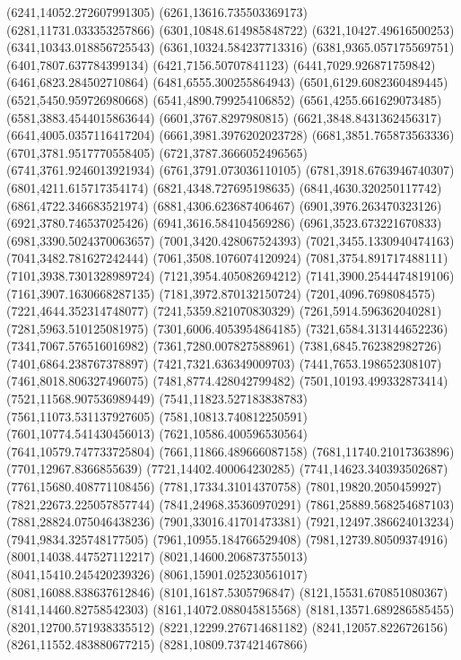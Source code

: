 {(6241,14052.272607991305)
(6261,13616.735503369173)
(6281,11731.033353257866)
(6301,10848.614985848722)
(6321,10427.49616500253)
(6341,10343.018856725543)
(6361,10324.584237713316)
(6381,9365.057175569751)
(6401,7807.637784399134)
(6421,7156.50707841123)
(6441,7029.926871759842)
(6461,6823.284502710864)
(6481,6555.300255864943)
(6501,6129.6082360489445)
(6521,5450.959726980668)
(6541,4890.799254106852)
(6561,4255.661629073485)
(6581,3883.4544015863644)
(6601,3767.8297980815)
(6621,3848.8431362456317)
(6641,4005.0357116417204)
(6661,3981.3976202023728)
(6681,3851.765873563336)
(6701,3781.9517770558405)
(6721,3787.3666052496565)
(6741,3761.9246013921934)
(6761,3791.073036110105)
(6781,3918.6763946740307)
(6801,4211.615717354174)
(6821,4348.727695198635)
(6841,4630.320250117742)
(6861,4722.346683521974)
(6881,4306.623687406467)
(6901,3976.263470323126)
(6921,3780.746537025426)
(6941,3616.584104569286)
(6961,3523.673221670833)
(6981,3390.5024370063657)
(7001,3420.428067524393)
(7021,3455.1330940474163)
(7041,3482.781627242444)
(7061,3508.1076074120924)
(7081,3754.891717488111)
(7101,3938.7301328989724)
(7121,3954.405082694212)
(7141,3900.2544474819106)
(7161,3907.1630668287135)
(7181,3972.870132150724)
(7201,4096.7698084575)
(7221,4644.352314748077)
(7241,5359.821070830329)
(7261,5914.596362040281)
(7281,5963.510125081975)
(7301,6006.4053954864185)
(7321,6584.313144652236)
(7341,7067.576516016982)
(7361,7280.007827588961)
(7381,6845.762382982726)
(7401,6864.238767378897)
(7421,7321.636349009703)
(7441,7653.198652308107)
(7461,8018.806327496075)
(7481,8774.428042799482)
(7501,10193.499332873414)
(7521,11568.907536989449)
(7541,11823.527183838783)
(7561,11073.531137927605)
(7581,10813.740812250591)
(7601,10774.541430456013)
(7621,10586.400596530564)
(7641,10579.747733725804)
(7661,11866.489666087158)
(7681,11740.21017363896)
(7701,12967.8366855639)
(7721,14402.400064230285)
(7741,14623.340393502687)
(7761,15680.408771108456)
(7781,17334.31014370758)
(7801,19820.2050459927)
(7821,22673.225057857744)
(7841,24968.35360970291)
(7861,25889.568254687103)
(7881,28824.075046438236)
(7901,33016.41701473381)
(7921,12497.386624013234)
(7941,9834.325748177505)
(7961,10955.184766529408)
(7981,12739.80509374916)
(8001,14038.447527112217)
(8021,14600.206873755013)
(8041,15410.245420239326)
(8061,15901.025230561017)
(8081,16088.838637612846)
(8101,16187.5305796847)
(8121,15531.670851080367)
(8141,14460.82758542303)
(8161,14072.088045815568)
(8181,13571.689286585455)
(8201,12700.571938335512)
(8221,12299.276714681182)
(8241,12057.8226726156)
(8261,11552.483880677215)
(8281,10809.737421467866)
}
